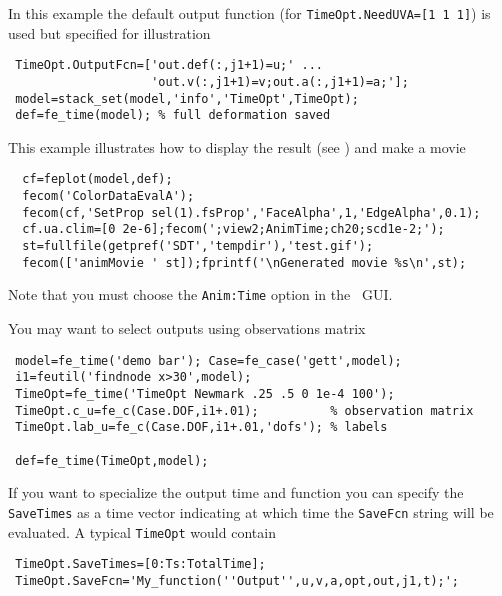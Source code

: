 In this example the default output function (for {\tt TimeOpt.NeedUVA=[1 1 1]}) is used but specified for illustration 

\begin{verbatim}
 TimeOpt.OutputFcn=['out.def(:,j1+1)=u;' ...
                    'out.v(:,j1+1)=v;out.a(:,j1+1)=a;']; 
 model=stack_set(model,'info','TimeOpt',TimeOpt);
 def=fe_time(model); % full deformation saved
\end{verbatim}%


\begin{SDT}
This example illustrates how to display the result (see \feplot) and make a movie

\begin{verbatim}
  cf=feplot(model,def);
  fecom('ColorDataEvalA'); 
  fecom(cf,'SetProp sel(1).fsProp','FaceAlpha',1,'EdgeAlpha',0.1);
  cf.ua.clim=[0 2e-6];fecom(';view2;AnimTime;ch20;scd1e-2;');
  st=fullfile(getpref('SDT','tempdir'),'test.gif'); 
  fecom(['animMovie ' st]);fprintf('\nGenerated movie %s\n',st);
\end{verbatim}%


Note that you must choose the {\tt Anim:Time} option in the \feplot\ GUI.
\end{SDT}

You may want to select outputs using observations matrix
\begin{verbatim}
 model=fe_time('demo bar'); Case=fe_case('gett',model);
 i1=feutil('findnode x>30',model);
 TimeOpt=fe_time('TimeOpt Newmark .25 .5 0 1e-4 100');
 TimeOpt.c_u=fe_c(Case.DOF,i1+.01);          % observation matrix
 TimeOpt.lab_u=fe_c(Case.DOF,i1+.01,'dofs'); % labels
 
 def=fe_time(TimeOpt,model);
\end{verbatim}%


If you want to specialize the output time and function you can specify the {\tt SaveTimes} as a time vector indicating at which time the {\tt SaveFcn} string will be evaluated. 
A typical {\tt TimeOpt} would contain

\begin{verbatim}
 TimeOpt.SaveTimes=[0:Ts:TotalTime];
 TimeOpt.SaveFcn='My_function(''Output'',u,v,a,opt,out,j1,t);';
\end{verbatim}


